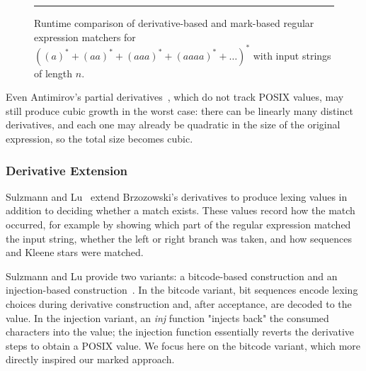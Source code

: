 \documentclass[12pt]{article}
\begin{document}
\begin{figure}[ht]
\mbox{}\bigskip
\begin{center}
\end{center}
    \mbox{}
    \hrule
\caption{Runtime comparison of derivative-based and mark-based regular expression matchers for $((a)^* + (aa)^* + (aaa)^* + (aaaa)^* + \dots )^*$ with input strings of length $n$.}

\end{figure}


Even Antimirov’s partial derivatives~\cite{Antimirov1996}, which do not track
POSIX values, may still produce cubic growth in the worst case: there can be
linearly many distinct derivatives, and each one may already be quadratic in
the size of the original expression, so the total size becomes cubic.

\FloatBarrier
\subsubsection{Derivative Extension}

Sulzmann and Lu~\cite{Sulzmann2014} extend Brzozowski’s derivatives to produce 
lexing values in addition to deciding whether a match exists. 
These values record how the match occurred, for example by showing which part
of the regular expression matched the input string, whether the left or right
branch was taken, and how sequences and Kleene stars were matched.


Sulzmann and Lu provide two variants: a bitcode-based construction and an
injection-based construction~\cite{Sulzmann2014}.  
In the bitcode variant, bit sequences encode lexing choices during derivative
construction and, after acceptance, are decoded to the value. In the injection
variant, an \textit{inj} function "injects back" the consumed characters into
the value; the injection function essentially reverts the derivative steps to
obtain a POSIX value. We focus here on the bitcode variant, which more directly
inspired our marked approach.
\end{document}
